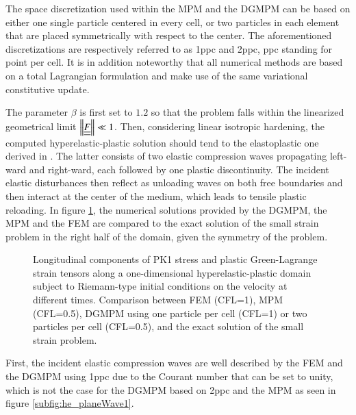 The space discretization used within the MPM and the DGMPM can be based on either one single particle centered in every cell, or two particles in each element that are placed symmetrically with respect to the center.
The aforementioned discretizations are respectively referred to as 1ppc and 2ppc, ppc standing for point per cell.
It is in addition noteworthy that all numerical methods are based on a total Lagrangian formulation and make use of the same variational constitutive update.

The parameter $\beta$ is first set to $1.2$ so that the problem falls within the linearized geometrical limit $\left\Vert{\underline{\underline{F}}}\right\Vert \ll 1$.
Then, considering linear isotropic hardening, the computed hyperelastic-plastic solution should tend to the elastoplastic one derived in \cite{Thomas_EP}.
The latter consists of two elastic compression waves propagating left-ward and right-ward, each followed by one plastic discontinuity.
The incident elastic disturbances then reflect as unloading waves on both free boundaries and then interact at the center of the medium, which leads to tensile plastic reloading.
In figure \ref{fig:hep_planeWave}, the numerical solutions provided by the DGMPM, the MPM and the FEM are compared to the exact solution of the small strain problem in the right half of the domain, given the symmetry of the problem.
\begin{figure}[ht]
  \centering
  {}
  {}
  {}
  
  \caption{Longitudinal components of PK1 stress and plastic Green-Lagrange strain tensors along a one-dimensional hyperelastic-plastic domain subject to Riemann-type initial conditions on the velocity at different times. Comparison between FEM (CFL=1), MPM (CFL=0.5), DGMPM using one particle per cell (CFL=1) or two particles per cell (CFL=0.5), and the exact solution of the small strain problem.}
  \label{fig:hep_planeWave}
\end{figure}
First, the incident elastic compression waves are well described by the FEM and the DGMPM using 1ppc due to the Courant number that can be set to unity, which is not the case for the DGMPM based on 2ppc and the MPM as seen in figure \ref{subfig:he_planeWave1}. 

